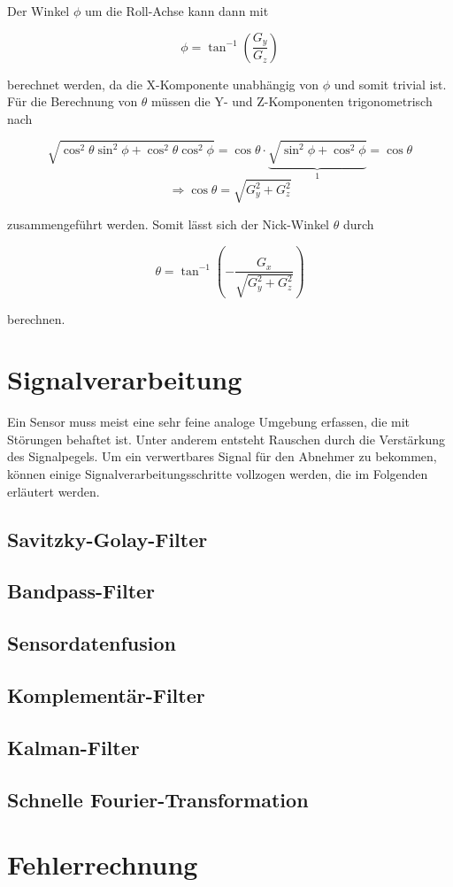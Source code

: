 	Der Winkel $\phi$ um die Roll-Achse kann dann mit
	
	\begin{equation}
		\phi = \tan^{-1}{\left(\frac{G_y}{G_z}\right)}
	\end{equation}
	
	berechnet werden, da die X-Komponente unabhängig von $\phi$ und somit trivial ist. Für die Berechnung von $\theta$ müssen die Y- und Z-Komponenten trigonometrisch nach
	
	\begin{equation*}
		\sqrt{\cos^2{\theta}\sin^2{\phi} + \cos^2{\theta}\cos^2{\phi}}
		= \cos{\theta} \cdot \underbrace{\sqrt{\sin^2{\phi} + \cos^2{\phi}}}_{1}
		= \cos{\theta}
	\end{equation*}
	\begin{equation*}
		\Rightarrow \cos{\theta} = \sqrt{G_y^2 + G_z^2}
	\end{equation*}
	
	zusammengeführt werden. Somit lässt sich der Nick-Winkel $\theta$ durch
	
	\begin{equation}
		\theta = \tan^{-1}{\left( - \frac{G_x}{\sqrt{G_y^2 + G_z^2}} \right)}
	\end{equation}
	
	berechnen\cite{mark-pedley}.
	
\section{Signalverarbeitung}
Ein Sensor muss meist eine sehr feine analoge Umgebung erfassen, die mit Störungen behaftet ist. Unter anderem entsteht Rauschen durch die Verstärkung des Signalpegels. Um ein verwertbares Signal für den Abnehmer zu bekommen, können einige Signalverarbeitungsschritte vollzogen werden, die im Folgenden erläutert werden.

	\subsection{Savitzky-Golay-Filter}
	
	\subsection{Bandpass-Filter}
	
	\subsection{Sensordatenfusion}

	\subsection{Komplementär-Filter}

	\subsection{Kalman-Filter}

	\subsection{Schnelle Fourier-Transformation}

\section{Fehlerrechnung}
